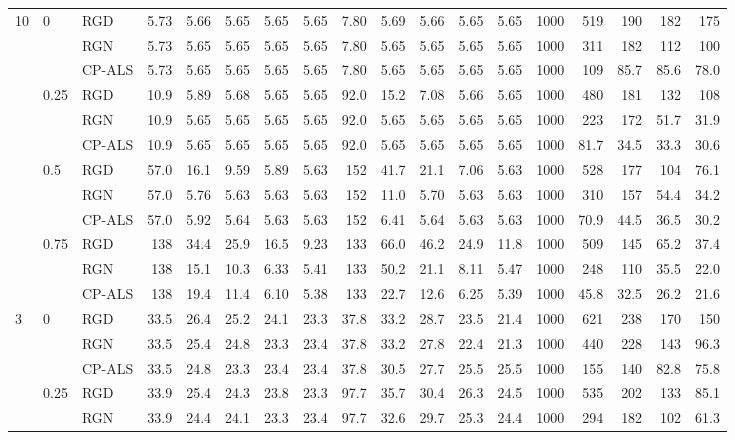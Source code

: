 \begin{table}[!htbp]
{\begin{tabular}{lll*{15}{r}}
\midrule
10 & 0 & RGD & 5.73 & 5.66 & 5.65 & 5.65 & 5.65 & 7.80 & 5.69 & 5.66 & 5.65 & 5.65 & 1000 & 519 & 190 & 182 & 175 \\
 &  & RGN & 5.73 & 5.65 & 5.65 & 5.65 & 5.65 & 7.80 & 5.65 & 5.65 & 5.65 & 5.65 & 1000 & 311 & 182 & 112 & 100 \\
 &  & CP-ALS & 5.73 & 5.65 & 5.65 & 5.65 & 5.65 & 7.80 & 5.65 & 5.65 & 5.65 & 5.65 & 1000 & 109 & 85.7 & 85.6 & 78.0 \\
\addlinespace
 & 0.25 & RGD & 10.9 & 5.89 & 5.68 & 5.65 & 5.65 & 92.0 & 15.2 & 7.08 & 5.66 & 5.65 & 1000 & 480 & 181 & 132 & 108 \\
 &  & RGN & 10.9 & 5.65 & 5.65 & 5.65 & 5.65 & 92.0 & 5.65 & 5.65 & 5.65 & 5.65 & 1000 & 223 & 172 & 51.7 & 31.9 \\
 &  & CP-ALS & 10.9 & 5.65 & 5.65 & 5.65 & 5.65 & 92.0 & 5.65 & 5.65 & 5.65 & 5.65 & 1000 & 81.7 & 34.5 & 33.3 & 30.6 \\
\addlinespace
 & 0.5 & RGD & 57.0 & 16.1 & 9.59 & 5.89 & 5.63 & 152 & 41.7 & 21.1 & 7.06 & 5.63 & 1000 & 528 & 177 & 104 & 76.1 \\
 &  & RGN & 57.0 & 5.76 & 5.63 & 5.63 & 5.63 & 152 & 11.0 & 5.70 & 5.63 & 5.63 & 1000 & 310 & 157 & 54.4 & 34.2 \\
 &  & CP-ALS & 57.0 & 5.92 & 5.64 & 5.63 & 5.63 & 152 & 6.41 & 5.64 & 5.63 & 5.63 & 1000 & 70.9 & 44.5 & 36.5 & 30.2 \\
\addlinespace
 & 0.75 & RGD & 138 & 34.4 & 25.9 & 16.5 & 9.23 & 133 & 66.0 & 46.2 & 24.9 & 11.8 & 1000 & 509 & 145 & 65.2 & 37.4 \\
 &  & RGN & 138 & 15.1 & 10.3 & 6.33 & 5.41 & 133 & 50.2 & 21.1 & 8.11 & 5.47 & 1000 & 248 & 110 & 35.5 & 22.0 \\
 &  & CP-ALS & 138 & 19.4 & 11.4 & 6.10 & 5.38 & 133 & 22.7 & 12.6 & 6.25 & 5.39 & 1000 & 45.8 & 32.5 & 26.2 & 21.6 \\
\midrule
3 & 0 & RGD & 33.5 & 26.4 & 25.2 & 24.1 & 23.3 & 37.8 & 33.2 & 28.7 & 23.5 & 21.4 & 1000 & 621 & 238 & 170 & 150 \\
 &  & RGN & 33.5 & 25.4 & 24.8 & 23.3 & 23.4 & 37.8 & 33.2 & 27.8 & 22.4 & 21.3 & 1000 & 440 & 228 & 143 & 96.3 \\
 &  & CP-ALS & 33.5 & 24.8 & 23.3 & 23.4 & 23.4 & 37.8 & 30.5 & 27.7 & 25.5 & 25.5 & 1000 & 155 & 140 & 82.8 & 75.8 \\
\addlinespace
 & 0.25 & RGD & 33.9 & 25.4 & 24.3 & 23.8 & 23.3 & 97.7 & 35.7 & 30.4 & 26.3 & 24.5 & 1000 & 535 & 202 & 133 & 85.1 \\
 &  & RGN & 33.9 & 24.4 & 24.1 & 23.3 & 23.4 & 97.7 & 32.6 & 29.7 & 25.3 & 24.4 & 1000 & 294 & 182 & 102 & 61.3 \\

\end{tabular}}
\end{table}
